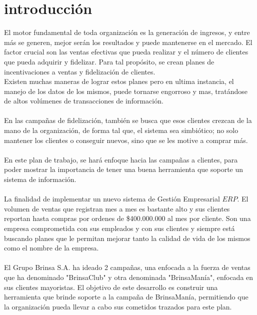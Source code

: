 \chapter*{introducci\'on}
El motor fundamental de toda organizaci\'on es la generaci\'on de ingresos, y entre m\'as se 
generen, mejor ser\'an los resultados y puede mantenerse en el mercado. El factor crucial son las ventas efectivas que pueda realizar y el n\'umero de clientes que pueda adquirir y fidelizar. Para tal prop\'osito, se crean planes de incentivaciones a ventas y fidelizaci\'on de clientes.%
\\%
Existen muchas maneras de lograr estos planes pero en ultima instancia, el manejo de los datos de los mismos, puede tornarse engorroso y mas, trat\'andose de altos vol\'umenes de transacciones de informaci\'on.%
\\%
\\%
En las campa\~nas de fidelizaci\'on, tambi\'en se busca que esos clientes crezcan de la mano de la organizaci\'on, de forma tal que, el sistema sea simbi\'otico; no solo mantener los clientes o conseguir nuevos, sino que se les motive a comprar m\'as.%
\\%
\\%
En este plan de trabajo, se har\'a enfoque hacia las campa\~nas a clientes, para poder mostrar la importancia de tener una buena herramienta que soporte un sistema de informaci\'on.%
\\%
\\%
La finalidad de implementar un nuevo sistema de Gesti\'on Empresarial \(ERP\). El volumen de ventas que registran mes a mes es bastante alto y sus clientes reportan hasta compras por ordenes de \$400.000.000 al mes por cliente. Son una empresa comprometida con sus empleados y con sus clientes y siempre est\'a buscando planes que le permitan mejorar tanto la calidad de vida de los mismos como el nombre de la empresa.%
\\%
\\%
El Grupo Brinsa S.A. ha ideado 2 campa\~nas, una enfocada a la fuerza de ventas que ha denominado "BrinsaClub" y otra denominada "BrinsaMan\'ia", enfocada en sus clientes mayoristas. El objetivo de este desarrollo es construir una herramienta que brinde soporte a la campa\~na de BrinsaMan\'ia, permitiendo que la organizaci\'on pueda llevar a cabo sus cometidos trazados para este plan.%